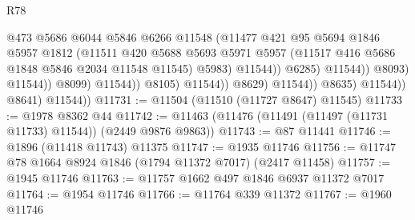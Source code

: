 \begin{lexlean}{R78}
\begin{coremodule}
                                                @473
                                                @5686
                                                @6044
                                                @5846
                                                @6266
                                                @11548
                                                (@11477
                                                  @421
                                                  @95
                                                  @5694
                                                  @1846
                                                  @5957
                                                  @1812
                                                  (@11511
                                                    @420
                                                    @5688
                                                    @5693
                                                    @5971
                                                    @5957
                                                    (@11517
                                                      @416
                                                      @5686
                                                      @1848
                                                      @5846
                                                      @2034
                                                      @11548
                                                      @11545)
                                                    @5983)
                                                  @11544))
                                              @6285)
                                            @11544))
                                        @8093)
                                      @11544))
                                  @8099)
                                @11544))
                            @8105)
                          @11544))
                      @8629)
                    @11544))
                @8635)
              @11544))
          @8641)
        @11544))
@11731 := @11504 (@11510 (@11727 @8647) @11545)
@11733 := @1978 @8362 @44
@11742 := @11463 (@11476 (@11491 (@11497 (@11731 @11733) @11544)) (@2449 @9876 @9863))
@11743 := @87 @11441
@11746 := @1896 (@11418 @11743) @11375
@11747 := @1935 @11746
@11756 := @11747 @78 @1664 @8924 @1846 (@1794 @11372 @7017) (@2417 @11458)
@11757 := @1945 @11746
@11763 := @11757 @1662 @497 @1846 @6937 @11372 @7017
@11764 := @1954 @11746
@11766 := @11764 @339 @11372
@11767 := @1960 @11746

\end{coremodule}
\end{lexlean}
